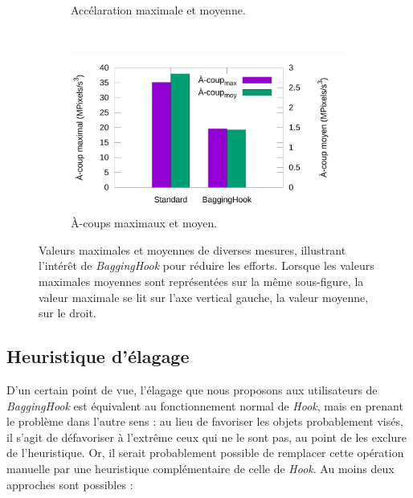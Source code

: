 \begin{figure}[htbp]
\begin{subfigure}[t]{0.49\textwidth}
			\caption{Accélaration maximale et moyenne.}
			\label{fig:accelHisto}
		\end{subfigure}
		~
		\begin{subfigure}[t]{0.49\textwidth}
			\centering
			\includegraphics[width=\textwidth]{figures/ch5/jerkHisto}
			\caption{À-coups maximaux et moyen.}
			\label{fig:jerkHisto}
		\end{subfigure}
		\caption[\emph{BaggingHook} -- effort physique]{Valeurs maximales et moyennes de diverses mesures, illustrant l'intérêt de \emph{BaggingHook} pour réduire les efforts. Lorsque les valeurs maximales moyennes sont représentées sur la même sous-figure, la valeur maximale se lit sur l'axe vertical gauche, la valeur moyenne, sur le droit.}
		\label{fig:baggingHookCursorStats}
	\end{figure}
	
	
	\subsection{Heuristique d'élagage}
	D'un certain point de vue, l'élagage que nous proposons aux utilisateurs de \emph{BaggingHook} est équivalent au fonctionnement normal de \emph{Hook}, mais en prenant le problème dans l'autre sens : au lieu de favoriser les objets probablement visés, il s'agit de défavoriser à l'extrême ceux qui ne le sont pas, au point de les exclure de l'heuristique. Or, il serait probablement possible de remplacer cette opération manuelle par une heuristique complémentaire de celle de \emph{Hook}. Au moins deux approches sont possibles :
	
